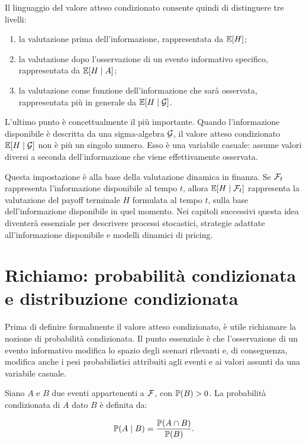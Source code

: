 Il linguaggio del valore atteso condizionato consente quindi di distinguere tre livelli:

\begin{enumerate}
    \item la valutazione prima dell'informazione, rappresentata da $ \mathbb{E}[H] $;

    \item la valutazione dopo l'osservazione di un evento informativo specifico, rappresentata da $ \mathbb{E}[H\mid A] $;

    \item la valutazione come funzione dell'informazione che sar\`{a} osservata, rappresentata pi\`{u} in generale da $ \mathbb{E}[H\mid \mathcal{G}] $.
\end{enumerate}

L'ultimo punto \`{e} concettualmente il pi\`{u} importante. Quando l'informazione disponibile \`{e} descritta da una sigma-algebra $ \mathcal{G} $, il valore atteso condizionato $ \mathbb{E}[H\mid \mathcal{G}] $ non \`{e} pi\`{u} un singolo numero. Esso \`{e} una variabile casuale: assume valori diversi a seconda dell'informazione che viene effettivamente osservata.

Questa impostazione \`{e} alla base della valutazione dinamica in finanza. Se $ \mathcal{F}_t $ rappresenta l'informazione disponibile al tempo $t$, allora $ \mathbb{E}[H\mid \mathcal{F}_t] $ rappresenta la valutazione del payoff terminale $H$ formulata al tempo $t$, sulla base dell'informazione disponibile in quel momento. Nei capitoli successivi questa idea diventer\`{a} essenziale per descrivere processi stocastici, strategie adattate all'informazione disponibile e modelli dinamici di pricing.

\section{Richiamo: probabilit\`{a} condizionata e distribuzione condizionata}

Prima di definire formalmente il valore atteso condizionato, \`{e} utile richiamare la nozione di probabilit\`{a} condizionata. Il punto essenziale \`{e} che l'osservazione di un evento informativo modifica lo spazio degli scenari rilevanti e, di conseguenza, modifica anche i pesi probabilistici attribuiti agli eventi e ai valori assunti da una variabile casuale.

Siano $A$ e $B$ due eventi appartenenti a $\mathcal{F}$, con $\mathbb{P}(B)>0$. La probabilit\`{a} condizionata di $A$ dato $B$ \`{e} definita da:

\[
\mathbb{P}(A\mid B)
=
\frac{\mathbb{P}(A\cap B)}{\mathbb{P}(B)}.
\]

